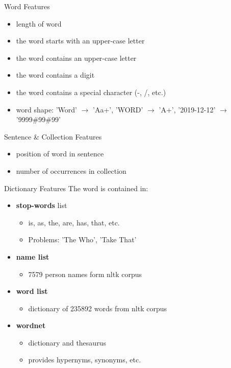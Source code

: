 \documentclass[12pt, tikz]{beamer}
\begin{document}
\begin{frame}[fragile]{Word Features}
	\begin{itemize}
		\item length of word
		\item the word starts with an upper-case letter
		\item the word contains an upper-case letter
		\item the word contains a digit
		\item the word contains a special character (-, /, etc.)
		\item word shape: 'Word' $\rightarrow$ 'Aa+', 'WORD' $\rightarrow$ 'A+', '2019-12-12' $\rightarrow$ '9999\#99\#99'
	\end{itemize}
\end{frame}

\begin{frame}[fragile]{Sentence \& Collection Features}
	\begin{itemize}
		\item position of word in sentence
		\item number of occurrences in collection
	\end{itemize}
\end{frame}

\begin{frame}[fragile]{Dictionary Features}
	The word is contained in:
	\begin{itemize}
		\item \textbf{stop-words} list
		\begin{itemize}
			\item is, as, the, are, has, that, etc.
			\item Problems: 'The Who', 'Take That'
		\end{itemize}
		\item \textbf{name list}
		\begin{itemize}
			\item 7579 person names form nltk corpus
		\end{itemize}
		\item \textbf{word list}
		\begin{itemize}
			\item dictionary of 235892 words from nltk corpus
		\end{itemize}
		\item \textbf{wordnet}
		\begin{itemize}
			\item dictionary and thesaurus
			\item provides hypernyms, synonyms, etc.
		\end{itemize}
	\end{itemize}
\end{frame}
\end{document}

